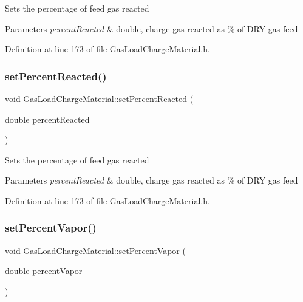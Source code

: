 Sets the percentage of feed gas reacted 
\begin{DoxyParams}{Parameters}
{\em percent\+Reacted} & double, charge gas reacted as \% of D\+RY gas feed \\
\hline
\end{DoxyParams}


Definition at line 173 of file Gas\+Load\+Charge\+Material.\+h.

\mbox{\label{class_gas_load_charge_material_a7142cb6bbfba53d640dd6f1590fe32f6}} 
\subsubsection{\texorpdfstring{set\+Percent\+Reacted()}{setPercentReacted()}\hspace{0.1cm}{\footnotesize\ttfamily [3/3]}}
{\footnotesize\ttfamily void Gas\+Load\+Charge\+Material\+::set\+Percent\+Reacted (\begin{DoxyParamCaption}\item[{double}]{percent\+Reacted }\end{DoxyParamCaption})\hspace{0.3cm}{\ttfamily [inline]}}

Sets the percentage of feed gas reacted 
\begin{DoxyParams}{Parameters}
{\em percent\+Reacted} & double, charge gas reacted as \% of D\+RY gas feed \\
\hline
\end{DoxyParams}


Definition at line 173 of file Gas\+Load\+Charge\+Material.\+h.

\mbox{\label{class_gas_load_charge_material_acace81e16ef531acb0a68462ab0ed25d}} 
\subsubsection{\texorpdfstring{set\+Percent\+Vapor()}{setPercentVapor()}\hspace{0.1cm}{\footnotesize\ttfamily [1/3]}}
{\footnotesize\ttfamily void Gas\+Load\+Charge\+Material\+::set\+Percent\+Vapor (\begin{DoxyParamCaption}\item[{double}]{percent\+Vapor }\end{DoxyParamCaption})\hspace{0.3cm}{\ttfamily [inline]}}

